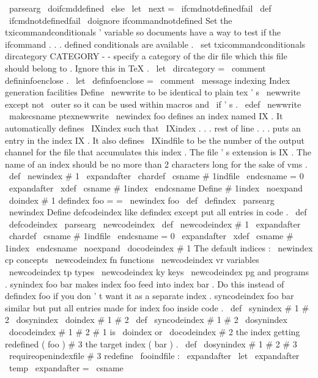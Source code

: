{{{{{
%
\
parsearg
{
\
doifcmddefined
{
\
else
\
let
\
next
=
\
ifcmdnotdefinedfail
}
}
}
\
def
\
ifcmdnotdefinedfail
{
\
doignore
{
ifcommandnotdefined
}
}
%
Set
the
txicommandconditionals
'
variable
so
documents
have
a
way
to
%
test
if
the
ifcommand
.
.
.
defined
conditionals
are
available
.
\
set
txicommandconditionals
%
dircategory
CATEGORY
-
-
specify
a
category
of
the
dir
file
%
which
this
file
should
belong
to
.
Ignore
this
in
TeX
.
\
let
\
dircategory
=
\
comment
%
defininfoenclose
.
\
let
\
definfoenclose
=
\
comment
\
message
{
indexing
}
%
Index
generation
facilities
%
Define
\
newwrite
to
be
identical
to
plain
tex
'
s
\
newwrite
%
except
not
\
outer
so
it
can
be
used
within
macros
and
\
if
'
s
.
\
edef
\
newwrite
{
\
makecsname
{
ptexnewwrite
}
}
%
\
newindex
{
foo
}
defines
an
index
named
IX
.
%
It
automatically
defines
\
IXindex
such
that
%
\
IXindex
.
.
.
rest
of
line
.
.
.
puts
an
entry
in
the
index
IX
.
%
It
also
defines
\
IXindfile
to
be
the
number
of
the
output
channel
for
%
the
file
that
accumulates
this
index
.
The
file
'
s
extension
is
IX
.
%
The
name
of
an
index
should
be
no
more
than
2
characters
long
%
for
the
sake
of
vms
.
%
\
def
\
newindex
#
1
{
%
\
expandafter
\
chardef
\
csname
#
1indfile
\
endcsname
=
0
\
expandafter
\
xdef
\
csname
#
1index
\
endcsname
{
%
%
Define
#
1index
\
noexpand
\
doindex
{
#
1
}
}
}
%
defindex
foo
=
=
\
newindex
{
foo
}
%
\
def
\
defindex
{
\
parsearg
\
newindex
}
%
Define
defcodeindex
like
defindex
except
put
all
entries
in
code
.
%
\
def
\
defcodeindex
{
\
parsearg
\
newcodeindex
}
%
\
def
\
newcodeindex
#
1
{
%
\
expandafter
\
chardef
\
csname
#
1indfile
\
endcsname
=
0
\
expandafter
\
xdef
\
csname
#
1index
\
endcsname
{
%
\
noexpand
\
docodeindex
{
#
1
}
}
%
}
%
The
default
indices
:
\
newindex
{
cp
}
%
concepts
\
newcodeindex
{
fn
}
%
functions
\
newcodeindex
{
vr
}
%
variables
\
newcodeindex
{
tp
}
%
types
\
newcodeindex
{
ky
}
%
keys
\
newcodeindex
{
pg
}
%
and
programs
.
%
synindex
foo
bar
makes
index
foo
feed
into
index
bar
.
%
Do
this
instead
of
defindex
foo
if
you
don
'
t
want
it
as
a
separate
index
.
%
%
syncodeindex
foo
bar
similar
but
put
all
entries
made
for
index
foo
%
inside
code
.
%
\
def
\
synindex
#
1
#
2
{
\
dosynindex
\
doindex
{
#
1
}
{
#
2
}
}
\
def
\
syncodeindex
#
1
#
2
{
\
dosynindex
\
docodeindex
{
#
1
}
{
#
2
}
}
%
#
1
is
\
doindex
or
\
docodeindex
#
2
the
index
getting
redefined
(
foo
)
%
#
3
the
target
index
(
bar
)
.
\
def
\
dosynindex
#
1
#
2
#
3
{
%
\
requireopenindexfile
{
#
3
}
%
%
redefine
\
fooindfile
:
\
expandafter
\
let
\
expandafter
\
temp
\
expandafter
=
\
csname
}}}}}
